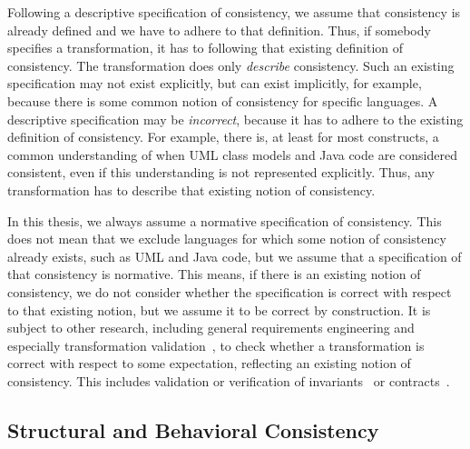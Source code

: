 Following a descriptive specification of consistency, we assume that consistency is already defined and we have to adhere to that definition.
Thus, if somebody specifies a transformation, it has to following that existing definition of consistency. 
The transformation does only \emph{describe} consistency.
Such an existing specification may not exist explicitly, but can exist implicitly, for example, because there is some common notion of consistency for specific languages.
A descriptive specification may be \emph{incorrect}, because it has to adhere to the existing definition of consistency.
For example, there is, at least for most constructs, a common understanding of when \gls{UML} class models and Java code are considered consistent, even if this understanding is not represented explicitly.
Thus, any transformation has to describe that existing notion of consistency.

In this thesis, we always assume a normative specification of consistency.
This does not mean that we exclude languages for which some notion of consistency already exists, such as \gls{UML} and Java code, but we assume that a specification of that consistency is normative.
This means, if there is an existing notion of consistency, we do not consider whether the specification is correct with respect to that existing notion, but we assume it to be correct by construction.
It is subject to other research, including general requirements engineering and especially transformation validation~\cite{rahim2015SurveyTransformationVerification-SoSym}, to check whether a transformation is correct with respect to some expectation, reflecting an existing notion of consistency.
This includes validation or verification of invariants~\cite{cabot2010VerificationInvariants-JSS} or contracts~\cite{azizi2017ContractVerification-ICCKE, vallecillo2012FormalTesting-FMMDE}.


\subsection{Structural and Behavioral Consistency}
\label{chap:networks:notions:types}

